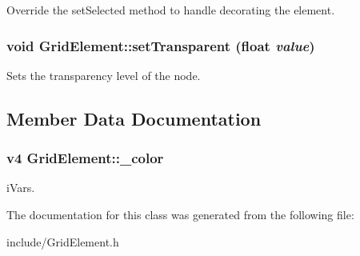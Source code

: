 \label{class_grid_element_a31b297b76d790e467e6052a7b12cea7f}
Override the setSelected method to handle decorating the element. \hypertarget{class_grid_element_a95cecc04d842554c8c4b74c6576c0a60}{
\subsubsection[{setTransparent}]{\setlength{\rightskip}{0pt plus 5cm}void GridElement::setTransparent (float {\em value})}}
\label{class_grid_element_a95cecc04d842554c8c4b74c6576c0a60}
Sets the transparency level of the node. 

\subsection{Member Data Documentation}
\hypertarget{class_grid_element_a071f85c15b3a75f56d9537f94ed354c8}{
\subsubsection[{\_\-color}]{\setlength{\rightskip}{0pt plus 5cm}v4 {\bf GridElement::\_\-color}}}
\label{class_grid_element_a071f85c15b3a75f56d9537f94ed354c8}
iVars. 

The documentation for this class was generated from the following file:\begin{DoxyCompactItemize}
\item 
include/GridElement.h\end{DoxyCompactItemize}
